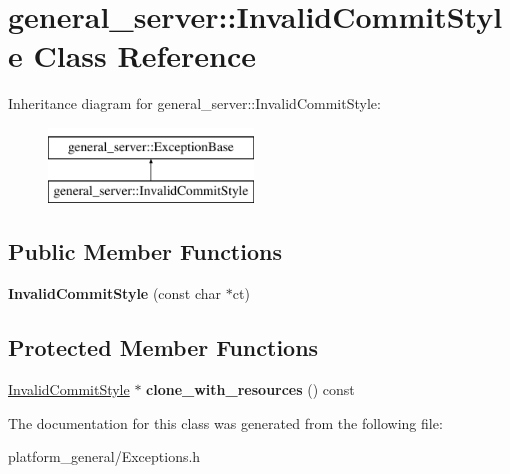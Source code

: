 \hypertarget{classgeneral__server_1_1InvalidCommitStyle}{\section{general\-\_\-server\-:\-:\-Invalid\-Commit\-Style \-Class \-Reference}
\label{classgeneral__server_1_1InvalidCommitStyle}
}
\-Inheritance diagram for general\-\_\-server\-:\-:\-Invalid\-Commit\-Style\-:\begin{figure}[H]
\begin{center}
\leavevmode
\includegraphics[height=2.000000cm]{classgeneral__server_1_1InvalidCommitStyle}
\end{center}
\end{figure}
\subsection*{\-Public \-Member \-Functions}
\begin{DoxyCompactItemize}
\item 
\hypertarget{classgeneral__server_1_1InvalidCommitStyle_ad0806c0987fa1118d2a84551b6821fe5}{{\bfseries \-Invalid\-Commit\-Style} (const char $\ast$ct)}\label{classgeneral__server_1_1InvalidCommitStyle_ad0806c0987fa1118d2a84551b6821fe5}

\end{DoxyCompactItemize}
\subsection*{\-Protected \-Member \-Functions}
\begin{DoxyCompactItemize}
\item 
\hypertarget{classgeneral__server_1_1InvalidCommitStyle_a9aac4a2950f37f06e991792cfb622245}{\hyperlink{classgeneral__server_1_1InvalidCommitStyle}{\-Invalid\-Commit\-Style} $\ast$ {\bfseries clone\-\_\-with\-\_\-resources} () const }\label{classgeneral__server_1_1InvalidCommitStyle_a9aac4a2950f37f06e991792cfb622245}

\end{DoxyCompactItemize}


\-The documentation for this class was generated from the following file\-:\begin{DoxyCompactItemize}
\item 
platform\-\_\-general/\-Exceptions.\-h\end{DoxyCompactItemize}
